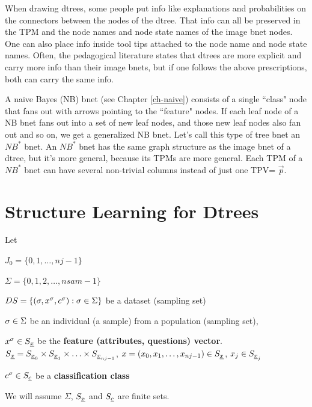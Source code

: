When drawing dtrees,
some people put
info 
like explanations 
and probabilities on the
connectors 
between the nodes
of  the dtree.
That
info can all
be preserved
in the TPM
and  the
node names and
 node state names
of the image bnet nodes.
One can also place info
inside tool tips attached to
the node name and node state names.
Often,
the pedagogical literature
states that 
dtrees are more explicit and  
carry
more info than their
image bnets,
but if one 
follows the above
prescriptions,
both can carry
the same info.



A naive Bayes (NB) bnet 
(see Chapter \ref{ch-naive})
consists of a single ``class"
 node that fans
out with arrows 
pointing to the
``feature" nodes.
If each leaf node
of a NB bnet
fans out into 
a set of new leaf
nodes, and those new
leaf nodes
also
fan out
and so on,
we get a 
generalized NB bnet.
Let's call
this type of tree bnet an $NB^*$ bnet.
An $NB^*$ bnet
has the same graph structure
as the image bnet of a dtree,
but it's more general,
because its 
TPMs are more general. 
Each 
TPM of a $NB^*$ bnet
 can have several non-trivial
columns instead of just one
TPV= $\vec{p}$.


\section{Structure Learning for  Dtrees}\label{sec-dtree-sl}



Let

$J_0=\{0,1, \ldots, nj-1\}$

$\Sigma=\{0,1,2, \ldots,nsam-1\}$

$DS=\{(\sigma, x^\sigma, c^\sigma): \sigma\in \Sigma\}$ be a dataset
(sampling set)

$\sigma\in \Sigma$ be an individual (a sample)
from a population (sampling set), 

$x^\sigma\in S_{\underline{x}}$ be the {\bf
feature (attributes, questions) vector}.
$S_{\underline{x}}= S_{{\underline{x}}_0}\times S_{{\underline{x}}_1}
\times\ldots\times S_{{\underline{x}}_{nj-1}}$,
$x=(x_0, x_1, \ldots, x_{nj-1})\in S_{\underline{x}}$, 
$x_j\in S_{{\underline{x}}_j}$


$c^\sigma\in S_{\underline{c}}$ be a {\bf classification class}

We will
assume $\Sigma$, $S_{\underline{x}}$ and $S_{\underline{c}}$ are finite sets.


